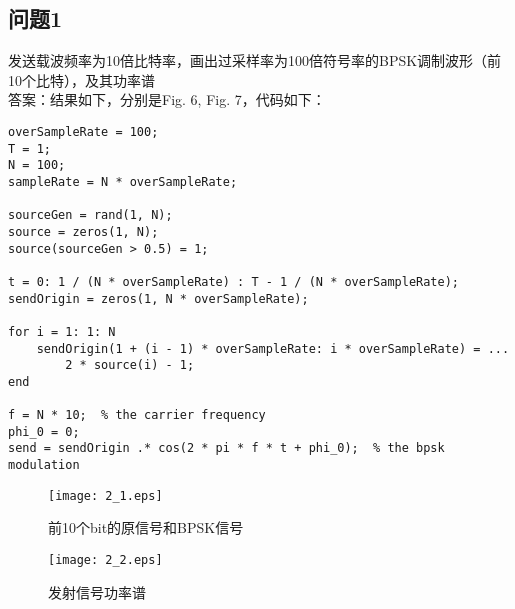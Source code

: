 \documentclass{article}
\begin{document}
\subsection{问题1}发送载波频率为10倍比特率，画出过采样率为100倍符号率的BPSK调制波形（前10个比特），及其功率谱\\
答案：结果如下，分别是Fig. 6, Fig. 7，代码如下：
\begin{lstlisting}
overSampleRate = 100;
T = 1;
N = 100;
sampleRate = N * overSampleRate;

sourceGen = rand(1, N);
source = zeros(1, N);
source(sourceGen > 0.5) = 1;

t = 0: 1 / (N * overSampleRate) : T - 1 / (N * overSampleRate);
sendOrigin = zeros(1, N * overSampleRate);

for i = 1: 1: N
    sendOrigin(1 + (i - 1) * overSampleRate: i * overSampleRate) = ...
        2 * source(i) - 1;
end

f = N * 10;  % the carrier frequency
phi_0 = 0;
send = sendOrigin .* cos(2 * pi * f * t + phi_0);  % the bpsk modulation
\end{lstlisting}
\begin{figure}[!h]
\begin{center}
		\texttt{[image: 2\_1.eps]}
		\caption{前10个bit的原信号和BPSK信号}
\end{center}
\end{figure}
\begin{figure}[!h]
\begin{center}
		\texttt{[image: 2\_2.eps]}
		\caption{发射信号功率谱}
\end{center}
\end{figure}
\end{document}

